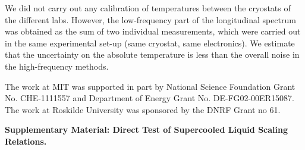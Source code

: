 \documentclass[reprint,showpacs,amsmath,amssymb,aip,jcp]{revtex4-1}
\begin{document}
We did not carry out any calibration of temperatures between the
cryostats of the different labs. However, the low-frequency part of
the longitudinal spectrum was obtained as the sum of two individual
measurements, which were carried out in the same experimental set-up
(same cryostat, same electronics). We estimate that the uncertainty on
the absolute temperature is less than the overall noise in the
high-frequency methods.





\begin{acknowledgments} 
  The work at MIT was supported in part by National Science Foundation
  Grant No. CHE-1111557 and Department of Energy Grant
  No. DE-FG02-00ER15087. The work at Roskilde University was sponsored
  by the DNRF Grant no 61.
\end{acknowledgments}



\pagebreak
\widetext
\begin{center}
\textbf{\large Supplementary Material: Direct Test of Supercooled Liquid Scaling Relations.}
\end{center}
\setcounter{equation}{0}
\setcounter{figure}{0}
\setcounter{table}{0}
\setcounter{page}{1}
\setcounter{section}{0}
\makeatletter
\renewcommand{\theequation}{S\arabic{equation}}
\renewcommand{\thefigure}{S\arabic{figure}}
\renewcommand{\bibnumfmt}[1]{[S#1]}
\renewcommand{\citenumfont}[1]{S#1}




\end{document}
